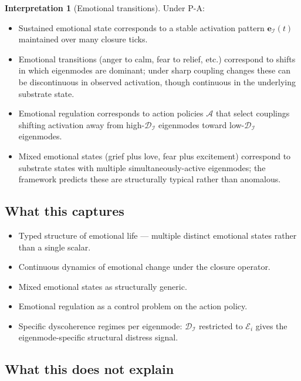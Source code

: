 \documentclass[11pt]{article}
\theoremstyle{plain}
\theoremstyle{definition}
\newtheorem{interpretation}[theorem]{Interpretation}
\theoremstyle{remark}
\newcommand{\Ical}{\mathcal{I}}
\newcommand{\Acal}{\mathcal{A}}
\newcommand{\Dcal}{\mathcal{D}}
\begin{document}
\begin{interpretation}[Emotional transitions]\label{int:emotional-trans}
Under P-A:
\begin{itemize}[leftmargin=2em]
\item Sustained emotional state corresponds to a stable activation pattern $\mathbf{e}_\Ical(t)$ maintained over many closure ticks.
\item Emotional transitions (anger to calm, fear to relief, etc.) correspond to shifts in which eigenmodes are dominant; under sharp coupling changes these can be discontinuous in observed activation, though continuous in the underlying substrate state.
\item Emotional regulation corresponds to action policies $\Acal$ that select couplings shifting activation away from high-$\Dcal_\Ical$ eigenmodes toward low-$\Dcal_\Ical$ eigenmodes.
\item Mixed emotional states (grief plus love, fear plus excitement) correspond to substrate states with multiple simultaneously-active eigenmodes; the framework predicts these are structurally typical rather than anomalous.
\end{itemize}
\end{interpretation}

\subsection{What this captures}

\begin{itemize}[leftmargin=2em]
\item Typed structure of emotional life --- multiple distinct emotional states rather than a single scalar.
\item Continuous dynamics of emotional change under the closure operator.
\item Mixed emotional states as structurally generic.
\item Emotional regulation as a control problem on the action policy.
\item Specific dyscoherence regimes per eigenmode: $\Dcal_\Ical$ restricted to $\mathcal{E}_i$ gives the eigenmode-specific structural distress signal.
\end{itemize}

\subsection{What this does not explain}
\end{document}
